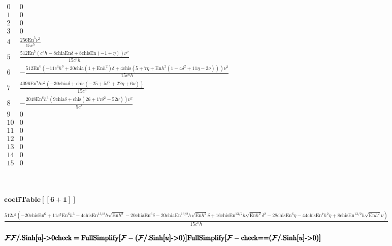 \documentclass{article}
\begin{document}
\noindent\(\begin{array}{l|l}
 0 & 0 \\
 1 & 0 \\
 2 & 0 \\
 3 & 0 \\
 4 & \frac{256 \text{En}^5 \nu ^2}{15 c^5} \\
 5 & \frac{512 \text{En}^5 \left(c^3 h-8 \text{chia} \text{En} \delta +8 \text{chis} \text{En} (-1+\eta )\right) \nu ^2}{15 c^8 h} \\
 6 & -\frac{512 \text{En}^6 \left(-11 c^3 h^3+20 \text{chia} \left(1+\text{En} h^2\right) \delta +4 \text{chis} \left(5+7 \eta +\text{En} h^2 \left(1-4
\delta ^2+11 \eta -2 \nu \right)\right)\right) \nu ^2}{15 c^8 h} \\
 7 & \frac{4096 \text{En}^7 h \nu ^2 \left(-30 \text{chia} \delta +\text{chis} \left(-25+5 \delta ^2+22 \eta +6 \nu \right)\right)}{15 c^8} \\
 8 & -\frac{2048 \text{En}^8 h^3 \left(9 \text{chia} \delta +\text{chis} \left(26+17 \delta ^2-52 \nu \right)\right) \nu ^2}{5 c^8} \\
 9 & 0 \\
 10 & 0 \\
 11 & 0 \\
 12 & 0 \\
 13 & 0 \\
 14 & 0 \\
 15 & 0 \\
\end{array}\)

\begin{doublespace}
\noindent\(\pmb{\text{}}\)
\end{doublespace}

\begin{doublespace}
\noindent\(\pmb{\text{coeffTable}[[6+1]]}\)
\end{doublespace}

\begin{doublespace}
\noindent\(\frac{512 \nu ^2 \left(-20 \text{chis} \text{En}^6+11 c^3 \text{En}^6 h^3-4 \text{chis} \text{En}^{13/2} h \sqrt{\text{En} h^2}-20 \text{chia}
\text{En}^6 \delta -20 \text{chia} \text{En}^{13/2} h \sqrt{\text{En} h^2} \delta +16 \text{chis} \text{En}^{13/2} h \sqrt{\text{En} h^2} \delta
^2-28 \text{chis} \text{En}^6 \eta -44 \text{chis} \text{En}^7 h^2 \eta +8 \text{chis} \text{En}^{13/2} h \sqrt{\text{En} h^2} \nu \right)}{15 c^8
h}\)
\end{doublespace}

\begin{doublespace}
\noindent\(\pmb{\mathcal{F}}\\
\pmb{\mathcal{F}\text{/.}\text{Sinh}[u]\text{-$>$}0}\\
\pmb{}\\
\pmb{\text{check}=\text{FullSimplify}[\mathcal{F}-(\mathcal{F}\text{/.}\text{Sinh}[u]\text{-$>$}0)]}\\
\pmb{}\\
\pmb{\text{FullSimplify}[\mathcal{F}-\text{check}\text{==}(\mathcal{F}\text{/.}\text{Sinh}[u]\text{-$>$}0)]}\)
\end{doublespace}
\end{document}
